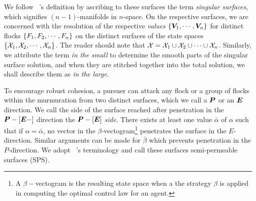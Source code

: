 We follow ~\cite{Isaacs1965}'s definition by ascribing to these surfaces the term \textit{singular surfaces}, which signifies $(n-1)$-manifolds in $n$-space.  On the respective surfaces, we are concerned with the resolution of the respective \textit{values} \ie  $\{\bm{V}_1, \cdots, \bm{V}_n\}$  for distinct flocks $\{F_1, F_2, \cdots, F_n\}$ on the distinct surfaces of the state spaces $\{\mathcal{X}_1, \mathcal{X}_2, \cdots, \mathcal{X}_n\}$. The reader should note that $\mathcal{X} = \mathcal{X}_1 \cup \mathcal{X}_2 \cup \cdots \cup \mathcal{X}_n$. %
Similarly, we  attribute the term \textit{in the small} to determine the smooth parts of the singular surface solution, and when they are stitched together into the total solution, we shall describe them as \textit{in the large}. 


To encourage robust cohesion, a pursuer can attack any flock or a group of flocks within the murmuration from two distinct surfaces, which we call a $\bm{P}$ or an $\bm{E}$ direction. We call the side of the surface reached after penetration in the $\bm{P}-[\bm{E}-]$ direction the $\bm{P}-[\bm{E}]$ \textit{side}. %
There exists at least one value $\bar{\alpha}$ of $\alpha$ such that if $\alpha = \bar{\alpha}$, no vector in the $\beta$-vectogram\footnote{A $\beta-$vectogram is the resulting state space when a the strategy $\beta$ is applied in computing the optimal control law for an agent.} penetrates the surface in the $E$-direction. Similar arguments can be made for $\bar{\beta}$ which prevents penetration in the $P$-direction. We adopt ~\cite{Isaacs1965}'s terminology and call these surfaces semi-permeable surfaces (SPS).



